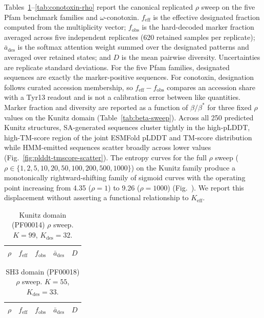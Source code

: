 Tables~\ref{tab:kunitz-rho}--\ref{tab:conotoxin-rho} report the canonical
replicated $\rho$ sweep on the five Pfam benchmark families and
$\omega$-conotoxin.
$f_{\mathrm{eff}}$ is the effective designated fraction computed from the
multiplicity vector; $f_{\mathrm{obs}}$ is the hard-decoded marker fraction
averaged across five independent replicates (620 retained samples per replicate);
$\bar{a}_{\mathrm{des}}$ is the softmax attention weight summed over the designated
patterns and averaged over retained states; and $D$ is the mean pairwise
diversity. Uncertainties are replicate
standard deviations. For the five Pfam families, designated sequences are
exactly the marker-positive sequences. For conotoxin, designation follows
curated accession membership, so $f_{\mathrm{eff}}-f_{\mathrm{obs}}$ compares
an accession share with a Tyr13 readout and is not a calibration error between
like quantities. Marker fraction and diversity are reported as a function
of $\beta/\beta^{*}$ for three fixed $\rho$ values on the Kunitz domain
(Table~\ref{tab:beta-sweep}). Across all 250 predicted Kunitz structures,
SA-generated sequences cluster tightly in the high-pLDDT, high-TM-score region
of the joint ESMFold pLDDT and TM-score distribution while HMM-emitted
sequences scatter broadly across lower values
(Fig.~\ref{fig:plddt-tmscore-scatter}). The entropy curves for the full $\rho$ sweep
($\rho \in \{1, 2, 5, 10, 20, 50, 100, 200, 500, 1000\}$) on the Kunitz
family produce a monotonically rightward-shifting family of sigmoid curves
with the operating point increasing from 4.35 ($\rho=1$) to 9.26 ($\rho=1000$)
(Fig.~). We report this displacement without asserting a
functional relationship to $K_{\mathrm{eff}}$.

\begin{table}[ht]
  \centering
  \caption{Kunitz domain (PF00014) $\rho$ sweep. $K=99$, $K_{\mathrm{des}}=32$.}
  \label{tab:kunitz-rho}
  \small
  \begin{tabular}{ccccc}
    \toprule
    $\rho$ & $f_{\mathrm{eff}}$ & $f_{\mathrm{obs}}$ & $\bar{a}_{\mathrm{des}}$ & $D$ \\
    \midrule
    
  \end{tabular}
\end{table}

\begin{table}[ht]
  \centering
  \caption{SH3 domain (PF00018) $\rho$ sweep. $K=55$, $K_{\mathrm{des}}=33$.}
  \label{tab:sh3-rho}
  \small
  \begin{tabular}{ccccc}
    \toprule
    $\rho$ & $f_{\mathrm{eff}}$ & $f_{\mathrm{obs}}$ & $\bar{a}_{\mathrm{des}}$ & $D$ \\
    \midrule
    
  \end{tabular}
\end{table}

